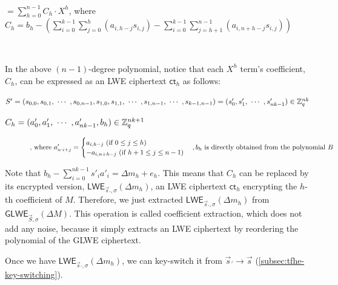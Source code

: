 $ $

$= \sum\limits_{h=0}^{n-1}  C_h \cdot X^{h}  $, where $C_h = b_h - \left(  \sum\limits_{i=0}^{k-1} \sum\limits_{j=0}^{h}(a_{i,h-j}s_{i,j}) - \sum\limits_{i=0}^{k-1} \sum\limits_{j=h+1}^{n-1}(a_{i,n+h-j}s_{i,j})  \right)$

$ $

\noindent In the above $(n-1)$-degree polynomial, notice that each $X^h$ term's coefficient, $C_h$, can be expressed as an LWE ciphertext $\textsf{ct}_h$ as follows:

$S' = (s_{0,0}, s_{0,1}, \text{ } \text{$\cdots$} \text{ }, s_{0,n-1}, s_{1,0}, s_{1,1}, \text{ } \text{$\cdots$} \text{ }, s_{1, n-1}, \text{ } \text{$\cdots$} \text{ }, s_{k-1, n-1}) = (s'_0, s'_1, \text{ } \text{$\cdots$} \text{ }, s'_{nk-1} ) \in \mathbb{Z}_q^{nk}$


$C_h = (a'_0, a'_1, \text{ } \text{$\cdots$} \text{ }, a'_{nk-1}, b_h) \in \mathbb{Z}_q^{nk + 1}$


\begin{figure}[h]
\[
    \text{, where } a'_{n \cdot i + j} =   
\begin{cases}
    a_{i,h - j} \text{ (if } 0 \leq j \leq h\text{)}\\
    -a_{i,n + h - j} \text{ (if } h+1 \leq j \leq n-1\text{)}\\
\end{cases}
\centering , b_h \text{ is directly obtained from the polynomial } B
\]
\end{figure}

\noindent Note that $b_h - \sum\limits_{i=0}^{nk-1}s'_ia'_i = \Delta m_h + e_h$. This means that $C_h$ can be replaced by its encrypted version, $\textsf{LWE}_{\vec{s}_{'}, \sigma}(\Delta m_h)$, an LWE ciphertext $\textsf{ct}_h$ encrypting the $h$-th coefficient of $M$. Therefore, we just extracted $\textsf{LWE}_{\vec{s}_{'}, \sigma}(\Delta m_h)$ from $\textsf{GLWE}_{\vec{S}, \sigma}(\Delta M)$. This operation is called coefficient extraction, which does not add any noise, because it simply extracts an LWE ciphertext by reordering the polynomial of the GLWE ciphertext. 

Once we have $\textsf{LWE}_{\vec{s}_{'}, \sigma}(\Delta m_h)$, we can key-switch it from $\vec{s}_{'} \rightarrow \vec{s}$ (\autoref{subsec:tfhe-key-switching}). 

